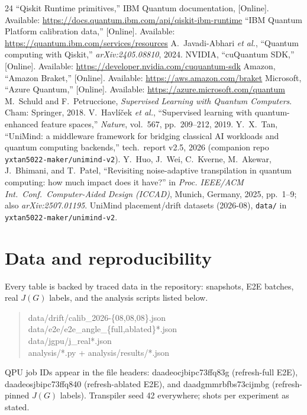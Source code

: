 \documentclass[journal,10pt,twocolumn]{IEEEtran}
\begin{document}
\begin{thebibliography}{24}
 ``Qiskit Runtime primitives,'' IBM Quantum documentation, [Online]. Available: \url{https://docs.quantum.ibm.com/api/qiskit-ibm-runtime}
 ``IBM Quantum Platform calibration data,'' [Online]. Available: \url{https://quantum.ibm.com/services/resources}
 A.~Javadi-Abhari \emph{et al.}, ``Quantum computing with Qiskit,'' \emph{arXiv:2405.08810}, 2024.
 NVIDIA, ``cuQuantum SDK,'' [Online]. Available: \url{https://developer.nvidia.com/cuquantum-sdk}
 Amazon, ``Amazon Braket,'' [Online]. Available: \url{https://aws.amazon.com/braket}
 Microsoft, ``Azure Quantum,'' [Online]. Available: \url{https://azure.microsoft.com/quantum}
 M.~Schuld and F.~Petruccione, \emph{Supervised Learning with Quantum Computers}. Cham: Springer, 2018.
 V.~Havl\'i\v{c}ek \emph{et al.}, ``Supervised learning with quantum-enhanced feature spaces,'' \emph{Nature}, vol.~567, pp.~209--212, 2019.
 Y.~X.~Tan, ``UniMind: a middleware framework for bridging classical AI workloads and quantum computing backends,'' tech.\ report v2.5, 2026 (companion repo \texttt{yxtan5022-maker/unimind-v2}).
 Y.~Huo, J.~Wei, C.~Kverne, M.~Akewar, J.~Bhimani, and T.~Patel, ``Revisiting noise-adaptive transpilation in quantum computing: how much impact does it have?'' in \emph{Proc. IEEE/ACM Int.\ Conf.\ Computer-Aided Design (ICCAD)}, Munich, Germany, 2025, pp.~1--9; also \emph{arXiv:2507.01195}.
 UniMind placement/drift datasets (2026-08), \texttt{data/} in \texttt{yxtan5022-maker/unimind-v2}.
\end{thebibliography}

\section*{Data and reproducibility}
\label{sec:data}
Every table is backed by traced data in the repository: snapshots, E2E batches, real $J(G)$ labels, and the
analysis scripts listed below.
\begin{quote}\small\raggedright\ttfamily
data/drift/calib\_2026-\{08,08,08\}.json\\
data/e2e/e2e\_angle\_\{full,ab\-lated\}*.json\\
data/jgpu/j\_real*.json\\
analysis/*.py + analysis/results/*.json
\end{quote}
QPU job IDs appear in the file headers:
{\small\ttfamily daadeocjbipc73ffq83g} (refresh-full E2E),
{\small\ttfamily daadeosjbipc73ffq840} (refresh-ablated E2E), and
{\small\ttfamily daadgmmrbfbs73cijmbg} (refresh-pinned $J(G)$ labels).
Transpiler seed 42 everywhere; shots per experiment as stated.
\end{document}
